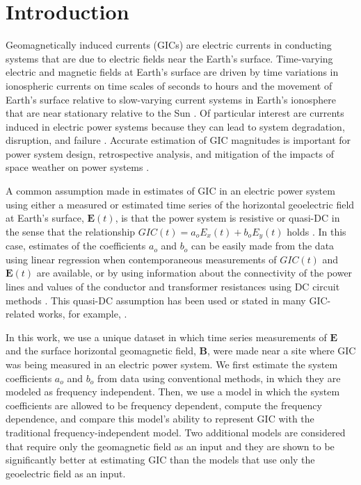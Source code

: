 \documentclass[draft,linenumbers]{agujournal2018}
\begin{document}
\section{Introduction}

Geomagnetically induced currents (GICs) are electric currents in conducting systems that are due to electric fields near the Earth's surface. Time-varying electric and magnetic fields at Earth's surface are driven by time variations in ionospheric currents on time scales of seconds to hours \citep{Ohtani2000} and the movement of Earth's surface relative to slow-varying current systems in Earth's ionosphere that are near stationary relative to the Sun \citep{Stening2013}. Of particular interest are currents induced in electric power systems because they can lead to system degradation, disruption, and failure \citep{Albertson1993,NERC2012,Gaunt2014}. Accurate estimation of GIC magnitudes is important for power system design, retrospective analysis, and mitigation of the impacts of space weather on power systems \citep{Molinski2002,Thomson2010,NERC2012,Gaunt2014}. 

A common assumption made in estimates of GIC in an electric power system using either a measured or estimated time series of the horizontal geoelectric field at Earth's surface, $\mathbf{E}(t)$, is that the power system is resistive or quasi-DC in the sense that the relationship $GIC(t) = a_oE_x(t) + b_oE_y(t)$ holds \citep{Albertson1981,Lehtinen1985}. In this case, estimates of the coefficients $a_o$ and $b_o$ can be easily made from the data using linear regression when contemporaneous measurements of $GIC(t)$ and $\mathbf{E}(t)$ are available, or by using information about the connectivity of the power lines and values of the conductor and transformer resistances using DC circuit methods \citep[e.g.,][]{Boteler2014a,Boteler2014b,Boteler2017}. This quasi-DC assumption has been used or stated in many GIC-related works, for example, \citet{Pulkkinen2007,Wik2008,Pulkkinen2010,Ngwira2011,Horton2012,Viljanen2012,Overbye2012,Marshall2013,Liu2014,Zheng2014,Watari2015}.

In this work, we use a unique dataset in which time series measurements of $\mathbf{E}$ and the surface horizontal geomagnetic field, $\mathbf{B}$, were made near a site where GIC was being measured in an electric power system.  We first estimate the system coefficients $a_o$ and $b_o$ from data using conventional methods, in which they are modeled as frequency independent. Then, we use a model in which the system coefficients are allowed to be frequency dependent, compute the frequency dependence, and compare this model's ability to represent GIC with the traditional frequency-independent model. Two additional models are considered that require only the geomagnetic field as an input and they are shown to be significantly better at estimating GIC than the models that use only the geoelectric field as an input. 
\end{document}
